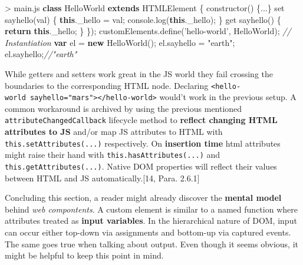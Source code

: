 \documentclass[]{assets/latex/ieee}
\newenvironment{Shaded}{}{}
\newcommand{\KeywordTok}[1]{\textcolor[rgb]{0.00,0.44,0.13}{\textbf{{#1}}}}
\newcommand{\StringTok}[1]{\textcolor[rgb]{0.25,0.44,0.63}{{#1}}}
\newcommand{\CommentTok}[1]{\textcolor[rgb]{0.38,0.63,0.69}{\textit{{#1}}}}
\newcommand{\VariableTok}[1]{\textcolor[rgb]{0.10,0.09,0.49}{{#1}}}
\newcommand{\ControlFlowTok}[1]{\textcolor[rgb]{0.00,0.44,0.13}{\textbf{{#1}}}}
\newcommand{\OperatorTok}[1]{\textcolor[rgb]{0.40,0.40,0.40}{{#1}}}
\newcommand{\AttributeTok}[1]{\textcolor[rgb]{0.49,0.56,0.16}{{#1}}}
\newcommand{\NormalTok}[1]{{#1}}
\begin{document}
\begin{Shaded}
\begin{Highlighting}[]
\OperatorTok{>} \VariableTok{main}\NormalTok{.}\AttributeTok{js}
\KeywordTok{class} \NormalTok{HelloWorld }\KeywordTok{extends} \NormalTok{HTMLElement }\OperatorTok{\{}
 \AttributeTok{constructor}\NormalTok{() }\OperatorTok{\{}\NormalTok{...}\OperatorTok{\}}
 \NormalTok{set }\AttributeTok{sayhello}\NormalTok{(val) }\OperatorTok{\{}
  \KeywordTok{this}\NormalTok{.}\AttributeTok{_hello} \OperatorTok{=} \NormalTok{val}\OperatorTok{;}
  \VariableTok{console}\NormalTok{.}\AttributeTok{log}\NormalTok{(}\KeywordTok{this}\NormalTok{.}\AttributeTok{_hello}\NormalTok{)}\OperatorTok{;}
 \OperatorTok{\}}
 \NormalTok{get }\AttributeTok{sayhello}\NormalTok{() }\OperatorTok{\{}
  \ControlFlowTok{return} \KeywordTok{this}\NormalTok{.}\AttributeTok{_hello}\OperatorTok{;}
 \OperatorTok{\}}
\OperatorTok{\}}\NormalTok{)}\OperatorTok{;}
\VariableTok{customElements}\NormalTok{.}\AttributeTok{define}\NormalTok{(}\StringTok{'hello-world'}\OperatorTok{,} \NormalTok{HelloWorld)}\OperatorTok{;}
\CommentTok{// Instantiation}
\KeywordTok{var} \NormalTok{el }\OperatorTok{=} \KeywordTok{new} \AttributeTok{HelloWorld}\NormalTok{()}\OperatorTok{;}
\VariableTok{el}\NormalTok{.}\AttributeTok{sayhello} \OperatorTok{=} \StringTok{"earth"}\OperatorTok{;}
\VariableTok{el}\NormalTok{.}\AttributeTok{sayhello}\OperatorTok{;}\CommentTok{//"earth"}
\end{Highlighting}
\end{Shaded}

While getters and setters work great in the JS world they fail crossing
the boundaries to the corresponding HTML node. Declaring
\texttt{\textless{}hello-world\ sayhello="mars"\textgreater{}\textless{}/hello-world\textgreater{}}
would't work in the previous setup. A common workaround is archived by
using the previous mentioned \texttt{attributeChangedCallback} lifecycle
method to \textbf{reflect changing HTML attributes to JS} and/or map JS
attributes to HTML with \texttt{this.setAttributes(...)} respectively.
On \textbf{insertion time} html attributes might raise their hand with
\texttt{this.hasAttributes(...)} and \texttt{this.getAttributes(...)}.
Native DOM properties will reflect their values between HTML and JS
automatically.{[}14, Para. 2.6.1{]}

Concluding this section, a reader might already discover the
\textbf{mental model} behind \emph{web compontents}. A custom element is
similar to a named function where attributes treated as \textbf{input
variables}. In the hierarchical nature of DOM, input can occur either
top-down via assignments and bottom-up via captured events. The same
goes true when talking about output. Even though it seems obvious, it
might be helpful to keep this point in mind.
\end{document}
